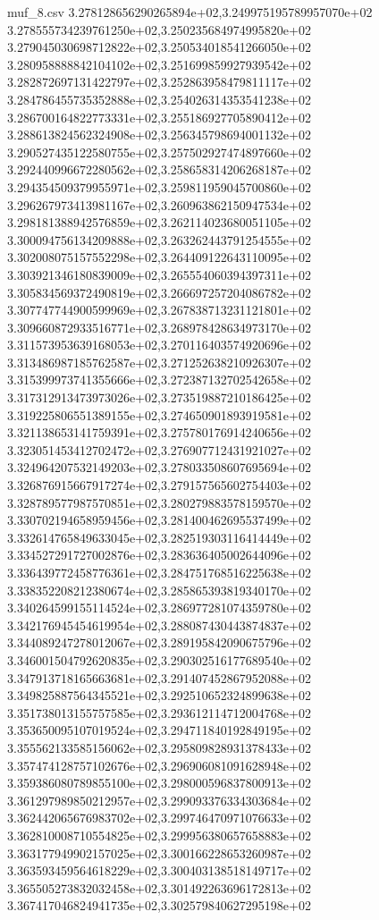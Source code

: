 \begin{filecontents*}{muf_8.csv}
3.278128656290265894e+02,3.249975195789957070e+02
3.278555734239761250e+02,3.250235684974995820e+02
3.279045030698712822e+02,3.250534018541266050e+02
3.280958888842104102e+02,3.251699859927939542e+02
3.282872697131422797e+02,3.252863958479811117e+02
3.284786455735352888e+02,3.254026314353541238e+02
3.286700164822773331e+02,3.255186927705890412e+02
3.288613824562324908e+02,3.256345798694001132e+02
3.290527435122580755e+02,3.257502927474897660e+02
3.292440996672280562e+02,3.258658314206268187e+02
3.294354509379955971e+02,3.259811959045700860e+02
3.296267973413981167e+02,3.260963862150947534e+02
3.298181388942576859e+02,3.262114023680051105e+02
3.300094756134209888e+02,3.263262443791254555e+02
3.302008075157552298e+02,3.264409122643110095e+02
3.303921346180839009e+02,3.265554060394397311e+02
3.305834569372490819e+02,3.266697257204086782e+02
3.307747744900599969e+02,3.267838713231121801e+02
3.309660872933516771e+02,3.268978428634973170e+02
3.311573953639168053e+02,3.270116403574920696e+02
3.313486987185762587e+02,3.271252638210926307e+02
3.315399973741355666e+02,3.272387132702542658e+02
3.317312913473973026e+02,3.273519887210186425e+02
3.319225806551389155e+02,3.274650901893919581e+02
3.321138653141759391e+02,3.275780176914240656e+02
3.323051453412702472e+02,3.276907712431921027e+02
3.324964207532149203e+02,3.278033508607695694e+02
3.326876915667917274e+02,3.279157565602754403e+02
3.328789577987570851e+02,3.280279883578159570e+02
3.330702194658959456e+02,3.281400462695537499e+02
3.332614765849633045e+02,3.282519303116414449e+02
3.334527291727002876e+02,3.283636405002644096e+02
3.336439772458776361e+02,3.284751768516225638e+02
3.338352208212380674e+02,3.285865393819340170e+02
3.340264599155114524e+02,3.286977281074359780e+02
3.342176945454619954e+02,3.288087430443874837e+02
3.344089247278012067e+02,3.289195842090675796e+02
3.346001504792620835e+02,3.290302516177689540e+02
3.347913718165663681e+02,3.291407452867952088e+02
3.349825887564345521e+02,3.292510652324899638e+02
3.351738013155757585e+02,3.293612114712004768e+02
3.353650095107019524e+02,3.294711840192849195e+02
3.355562133585156062e+02,3.295809828931378433e+02
3.357474128757102676e+02,3.296906081091628948e+02
3.359386080789855100e+02,3.298000596837800913e+02
3.361297989850212957e+02,3.299093376334303684e+02
3.362442065676983702e+02,3.299746470971076633e+02
3.362810008710554825e+02,3.299956380657658883e+02
3.363177949902157025e+02,3.300166228653260987e+02
3.363593459564618229e+02,3.300403138518149717e+02
3.365505273832032458e+02,3.301492263696172813e+02
3.367417046824941735e+02,3.302579840627295198e+02

\end{filecontents*}
